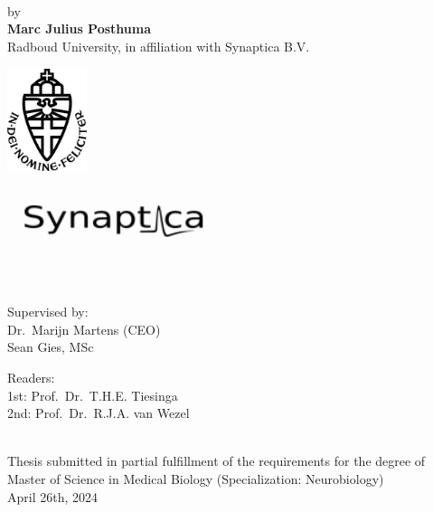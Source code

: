 \documentclass[12pt]{report}
\begin{document}
\begin{titlepage}
    \centering
    \vspace*{1cm}
    \\
    \\
    \\[1cm]
    \Large by\\[1cm]
    \Large \textbf{Marc Julius Posthuma}\\[1cm]
    \Large Radboud University, in affiliation with Synaptica B.V.\\[2cm]
    \begin{minipage}[c]{0.5\textwidth}
        \centering
        \includegraphics[height=3cm,keepaspectratio]{Radboud_Universiteit_Nijmegen-logo.png}
    \end{minipage}%
    \begin{minipage}[c]{0.5\textwidth}
        \centering
        \includegraphics[height=2cm,keepaspectratio]{synaptica_logo.PNG}
    \end{minipage}\\[1cm]
    \vfill
    \begin{minipage}[t]{0.5\textwidth}
        \centering
        \Large Supervised by:\\
        Dr.\ Marijn Martens (CEO)\\
        Sean Gies, MSc
    \end{minipage}%
    \begin{minipage}[t]{0.5\textwidth}
        \centering
        \Large Readers:\\
        1st: Prof.\ Dr.\ T.H.E. Tiesinga\\
        2nd: Prof.\ Dr.\ R.J.A. van Wezel
    \end{minipage}\\[2cm]

    \footnotesize Thesis submitted in partial fulfillment of the requirements
    for the degree of Master of Science in Medical Biology (Specialization: Neurobiology)\\[1cm]
    \Large April 26th, 2024
\end{titlepage}
\end{document}
